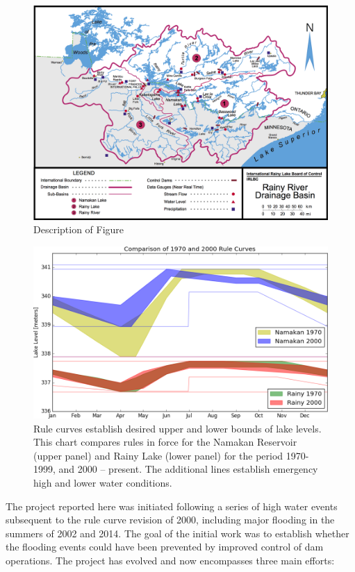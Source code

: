 \documentclass[preprint,times]{elsarticle}
\begin{document}
\begin{figure}
\includegraphics[width=\linewidth]{rl_basinmap.png}
\caption{Description of Figure}\label{figure:2}
\end{figure}

\begin{figure}
\includegraphics[width=\linewidth]{RuleCurveComparison.png}
\caption{Rule curves establish desired upper and lower bounds of lake levels. This chart compares rules in force for the Namakan Reservoir (upper panel) and Rainy Lake (lower panel) for the period 1970-1999, and 2000 -- present. The additional lines establish emergency high and lower water conditions.} \label{figure:3}
\end{figure}

The project reported here was initiated following a series of high water events subsequent to the rule curve revision of 2000, including major flooding in the summers of 2002 and 2014. The goal of the initial work was to establish whether the flooding events could have been prevented by improved control of dam operations.  The project has evolved and now encompasses three main efforts:
\end{document}
